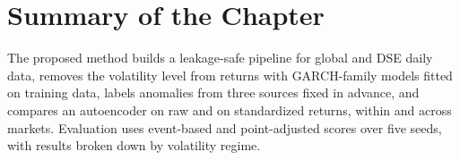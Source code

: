 \section{Summary of the Chapter}
The proposed method builds a leakage-safe pipeline for global and DSE daily data, removes
the volatility level from returns with GARCH-family models fitted on training data, labels
anomalies from three sources fixed in advance, and compares an autoencoder on raw and on
standardized returns, within and across markets. Evaluation uses event-based and
point-adjusted scores over five seeds, with results broken down by volatility regime.

